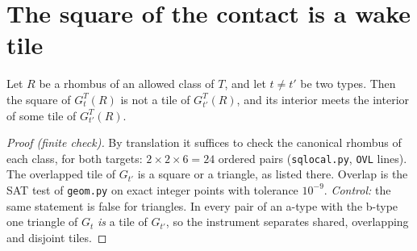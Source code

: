 \documentclass[11pt]{article}
\theoremstyle{definition}\newtheorem{definition}[theorem]{Definition}\newtheorem{remark}[theorem]{Remark}
\begin{document}
\section{The square of the contact is a wake tile}\label{sec:sq}
\begin{lemma}\label{lem:ovl}
Let $R$ be a rhombus of an allowed class of $T$, and let $t\neq t'$ be two types. Then the square of $G^T_t(R)$ is not a tile of $G^T_{t'}(R)$, and its interior meets the interior of some tile of $G^T_{t'}(R)$.
\end{lemma}
\begin{proof}[Proof (finite check)]
By translation it suffices to check the canonical rhombus of each class, for both targets: $2\times2\times6=24$ ordered pairs (\texttt{sqlocal.py}, \texttt{OVL} lines). The overlapped tile of $G_{t'}$ is a square or a triangle, as listed there. Overlap is the SAT test of \texttt{geom.py} on exact integer points with tolerance $10^{-9}$. \emph{Control:} the same statement is false for triangles. In every pair of an a-type with the b-type one triangle of $G_t$ \emph{is} a tile of $G_{t'}$, so the instrument separates shared, overlapping and disjoint tiles.
\end{proof}
\end{document}
